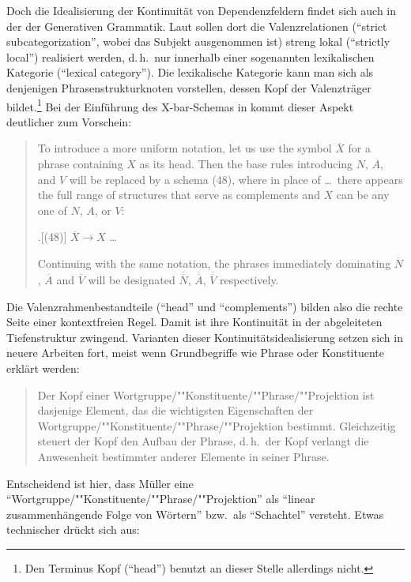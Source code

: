 Doch die Idealisierung der Kontinuität von Dependenzfeldern findet sich auch in der  der Generativen Grammatik. Laut \citet[122, 215]{Chomsky:65} sollen dort die Valenzrelationen ("`strict subcategorization"', wobei das Subjekt ausgenommen ist) streng lokal ("`strictly local"') realisiert werden, d.\,h.\ nur innerhalb einer sogenannten lexikalischen Kategorie ("`lexical category"'). Die lexikalische Kategorie kann man sich als denjenigen Phrasenstrukturknoten vorstellen, dessen Kopf der Valenzträger bildet.\footnote{Den Terminus Kopf ("`head"') benutzt \cite{Chomsky:65} an dieser Stelle allerdings nicht.} Bei der Einführung des X-bar-Schemas in \cite{Chomsky:70} kommt dieser Aspekt deutlicher zum Vorschein:
\begin{quote}
To introduce a more uniform notation, let us use the
symbol $\overline{X}$ for a phrase containing $X$ as its head. Then the base rules introducing $N$, $A$, and $V$ will be replaced by a schema (48), where in place
of \ldots\ there appears the full range of structures that serve as complements
and $X$ can be any one of $N$, $A$, or $V$:

\ex.[(48)] $\overline{X} \to X$ \ldots

Continuing with the same notation, the phrases immediately dominating $\overline{N}$,
$\overline{A}$ and $\overline{V}$ will be designated $\overline{\overline{N}}$, $\overline{\overline{A}}$, $\overline{\overline{V}}$ respectively. \citep[210]{Chomsky:70} 
\end{quote}    
Die Valenzrahmenbestandteile ("`head"' und "`complements"') bilden also die rechte Seite einer kontextfreien Regel. Damit ist ihre Kontinuität in der abgeleiteten Tiefenstruktur zwingend. Varianten dieser Kontinuitätsidealisierung setzen sich in neuere Arbeiten fort, meist wenn Grundbegriffe wie Phrase oder Konstituente erklärt werden:
\begin{quote}
Der Kopf einer Wortgruppe/""Konstituente/""Phrase/""Projektion ist dasjenige Element, das die wichtigsten Eigenschaften der Wortgruppe/""Konstituente/""Phrase/""Projektion bestimmt. Gleichzeitig steuert der Kopf den Aufbau der Phrase, d.\,h.\ der Kopf verlangt die Anwesenheit bestimmter anderer Elemente in seiner Phrase. \citep[19]{Mueller:10}
\end{quote}
Entscheidend ist hier, dass Müller eine "`Wortgruppe/""Konstituente/""Phrase/""Projektion"' als "`linear zusammenhängende Folge von Wörtern"' \citep[4]{Mueller:10} bzw.\ als "`Schachtel"' \citep[Abbildung~1.1]{Mueller:10} versteht. Etwas technischer drückt sich \cite{Jacobs:09} aus:
